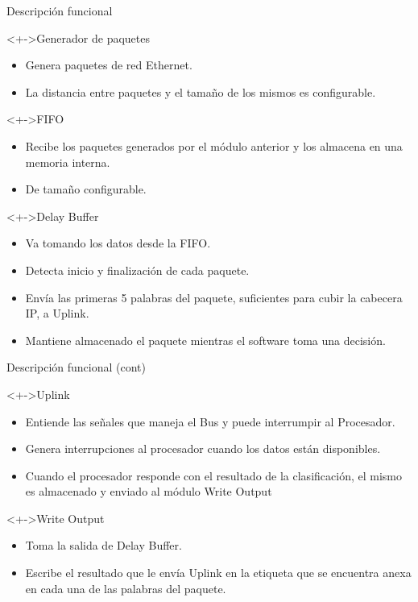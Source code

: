 \documentclass[xcolor=dvipsnames]{beamer}
\begin{document}
\begin{frame}{Descripción funcional}
\begin{block}<+->{Generador de paquetes}   
    \begin{itemize}
      \scriptsize
     	\item Genera paquetes de red Ethernet.
	\item La distancia entre paquetes y el tamaño de los mismos es configurable. 
    \end{itemize}
  \end{block}
\begin{block}<+->{FIFO}   
    \begin{itemize}
      \scriptsize
     	\item Recibe los paquetes generados por el módulo anterior y los almacena en una memoria interna.
	\item De tamaño configurable.
    \end{itemize}
  \end{block}
\begin{block}<+->{Delay Buffer}   
    \begin{itemize}
      \scriptsize
     	\item Va tomando los datos desde la FIFO.
	\item Detecta inicio y finalización de cada paquete.
	\item Envía las primeras 5 palabras del paquete, suficientes para cubir la cabecera IP, a Uplink.
	\item Mantiene almacenado el paquete mientras el software toma una decisión.
    \end{itemize}
  \end{block}
\end{frame}
\begin{frame}{Descripción funcional (cont)}
  \begin{block}<+->{Uplink}   
    \begin{itemize}
      \scriptsize
     	\item Entiende las señales que maneja el Bus y puede interrumpir al Procesador.
	\item Genera interrupciones al procesador cuando los datos están disponibles.
	\item Cuando el procesador responde con el resultado de la clasificación, el mismo es almacenado y enviado al módulo Write Output
    \end{itemize}
  \end{block}
\begin{block}<+->{Write Output}   
    \begin{itemize}
      \scriptsize
     	\item Toma la salida de Delay Buffer.
	\item Escribe el resultado que le envía Uplink en la etiqueta que se encuentra anexa en cada una de las palabras del paquete.
    \end{itemize}
  \end{block}
\end{frame}
\end{document}
